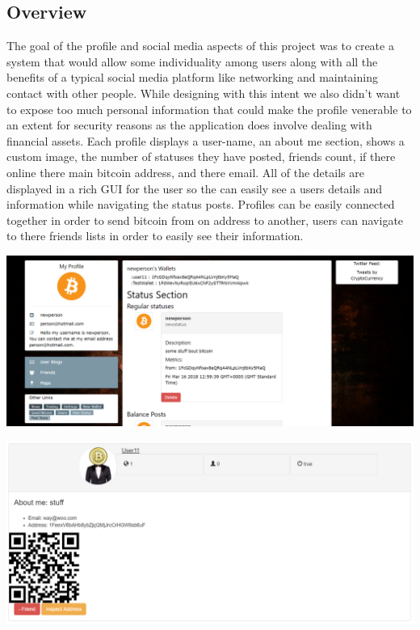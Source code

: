 \subsection{Overview}
The goal of the profile and social media aspects of this project was to create a system that would allow some individuality among users along with all the benefits of a typical social media platform like networking and maintaining contact with other people. While designing with this intent we also didn't want to expose too much personal information that could make the profile venerable to an extent for security reasons as the application does involve dealing with financial assets. Each profile displays a user-name, an about me section, shows a custom image, the number of statuses they have posted, friends count, if there online there main bitcoin address, and there email. All of the details are displayed in a rich GUI for the user so the can easily see a users details and information while navigating the status posts. Profiles can be easily connected together in order to send bitcoin from on address to another, users can navigate to there friends lists in order to easily see their information.

\includegraphics[]{img/UserProfile.png}

\includegraphics[]{img/Friendslist.png}

